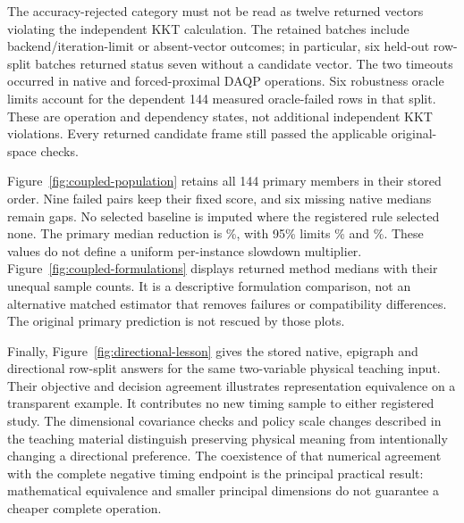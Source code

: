 The accuracy-rejected category must not be read as twelve returned
vectors violating the independent KKT calculation. The retained batches
include backend/iteration-limit or absent-vector outcomes; in particular,
six held-out row-split batches returned status seven without a candidate
vector. The two timeouts occurred in native and forced-proximal DAQP
operations. Six robustness oracle limits account for the dependent
144 measured oracle-failed rows in that split. These are operation and
dependency states, not additional independent KKT violations. Every
returned candidate frame still passed the applicable original-space checks.



Figure~\ref{fig:coupled-population} retains all 144 primary members in their
stored order. Nine failed pairs keep their fixed score, and six missing
native medians remain gaps. No selected baseline is imputed where the
registered rule selected none. The primary median reduction is
\PrimaryEstimate\%, with 95\% limits \PrimaryLower\% and \PrimaryUpper\%.
These values do not define a uniform per-instance slowdown multiplier.
Figure~\ref{fig:coupled-formulations} displays returned method medians with
their unequal sample counts. It is a descriptive formulation comparison,
not an alternative matched estimator that removes failures or compatibility
differences. The original primary prediction is not rescued by those plots.



Finally, Figure~\ref{fig:directional-lesson} gives the stored native, epigraph
and directional row-split answers for the same two-variable physical teaching
input. Their objective and decision agreement illustrates representation
equivalence on a transparent example. It contributes no new timing sample
to either registered study. The dimensional covariance checks and policy
scale changes described in the teaching material distinguish preserving
physical meaning from intentionally changing a directional preference.
The coexistence of that numerical agreement with the complete negative
timing endpoint is the principal practical result: mathematical equivalence
and smaller principal dimensions do not guarantee a cheaper complete operation.

